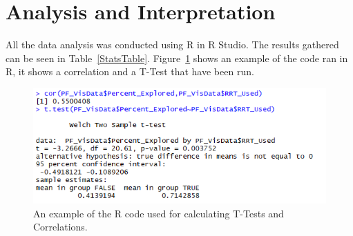 \documentclass[journal]{IEEEtran}
\begin{document}
	\section{Analysis and Interpretation} \label{Analysis}
	All the data analysis was conducted using R in R Studio. The results gathered can be seen in Table~\ref{StatsTable}.  Figure~\ref{image:RCor} shows an example of the code ran in R, it shows a correlation and a T-Test that have been run. 
	
	\begin{figure}[h]
		\includegraphics[width=1.0\linewidth]{RCor.png}
		\caption{An example of the R code used for calculating T-Tests and Correlations.}
		\label{image:RCor}
	\end{figure}  
	
\end{document}
